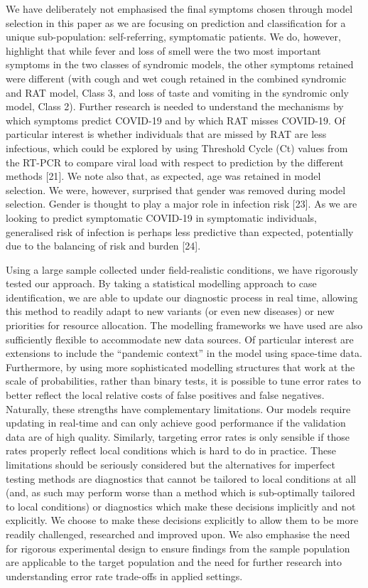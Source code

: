 \documentclass[]{elsarticle} %
\begin{document}
We have deliberately not emphasised the final symptoms chosen through model selection in this paper as we are focusing on prediction and classification for a unique sub-population: self-referring, symptomatic patients.
We do, however, highlight that while fever and loss of smell were the two most important symptoms in the two classes of syndromic models,
the other symptoms retained were different (with cough and wet cough retained in the combined syndromic and RAT model, Class 3, and loss of taste and vomiting in the syndromic only model, Class 2).
Further research is needed to understand the mechanisms by which symptoms predict COVID-19 and by which RAT misses COVID-19.
Of particular interest is whether individuals that are missed by RAT are less infectious, which could be explored by using Threshold Cycle (Ct) values from the RT-PCR to compare viral load with respect to prediction by the different methods {[}21{]}.
We note also that, as expected, age was retained in model selection.
We were, however, surprised that gender was removed during model selection.
Gender is thought to play a major role in infection risk {[}23{]}.
As we are looking to predict symptomatic COVID-19 in symptomatic individuals, generalised risk of infection is perhaps less predictive than expected, potentially due to the balancing of risk and burden {[}24{]}.

Using a large sample collected under field-realistic conditions, we have rigorously tested our approach.
By taking a statistical modelling approach to case identification, we are able to update our diagnostic process in real time, allowing this method to readily adapt to new variants (or even new diseases) or new priorities for resource allocation.
The modelling frameworks we have used are also sufficiently flexible to accommodate new data sources.
Of particular interest are extensions to include the ``pandemic context'' in the model using space-time data.
Furthermore, by using more sophisticated modelling structures that work at the scale of probabilities, rather than binary tests, it is possible to tune error rates to better reflect the local relative costs of false positives and false negatives.
Naturally, these strengths have complementary limitations.
Our models require updating in real-time and can only achieve good performance if the validation data are of high quality.
Similarly, targeting error rates is only sensible if those rates properly reflect local conditions which is hard to do in practice.
These limitations should be seriously considered but the alternatives for imperfect testing methods are diagnostics that cannot be tailored to local conditions at all (and, as such may perform worse than a method which is sub-optimally tailored to local conditions) or diagnostics which make these decisions implicitly and not explicitly.
We choose to make these decisions explicitly to allow them to be more readily challenged, researched and improved upon.
We also emphasise the need for rigorous experimental design to ensure findings from the sample population are applicable to the target population and the need for further research into understanding error rate trade-offs in applied settings.
\end{document}
